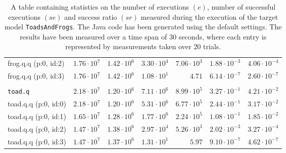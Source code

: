 \begin{table}[htbp]
{\begin{tabular}{lrrrrrr}
\hspace{3mm}frog.q.q (p:0, id:2)              &  $1.76 \cdot 10^{7}$ &  $1.42 \cdot 10^{6}$ &  $3.30 \cdot 10^{4}$ &  $7.06 \cdot 10^{3}$ & $1.88 \cdot 10^{-3}$ & $4.06 \cdot 10^{-4}$ \\
\hspace{3mm}frog.q.q (p:0, id:3)              &  $1.76 \cdot 10^{7}$ &  $1.42 \cdot 10^{6}$ &  $1.08 \cdot 10^{1}$ &               $4.71$ & $6.14 \cdot 10^{-7}$ & $2.60 \cdot 10^{-7}$ \\
\\[-8pt]\texttt{toad.q}                       &  $2.18 \cdot 10^{7}$ &  $1.20 \cdot 10^{6}$ &  $7.11 \cdot 10^{6}$ &  $8.99 \cdot 10^{5}$ & $3.27 \cdot 10^{-1}$ & $4.21 \cdot 10^{-2}$ \\
\hspace{3mm}toad.q.q (p:0, id:0)              &  $2.18 \cdot 10^{7}$ &  $1.20 \cdot 10^{6}$ &  $5.31 \cdot 10^{6}$ &  $6.77 \cdot 10^{5}$ & $2.44 \cdot 10^{-1}$ & $3.17 \cdot 10^{-2}$ \\
\hspace{3mm}toad.q.q (p:0, id:1)              &  $1.65 \cdot 10^{7}$ &  $1.28 \cdot 10^{6}$ &  $1.77 \cdot 10^{6}$ &  $2.24 \cdot 10^{5}$ & $1.08 \cdot 10^{-1}$ & $1.85 \cdot 10^{-2}$ \\
\hspace{3mm}toad.q.q (p:0, id:2)              &  $1.47 \cdot 10^{7}$ &  $1.38 \cdot 10^{6}$ &  $2.97 \cdot 10^{4}$ &  $5.26 \cdot 10^{3}$ & $2.02 \cdot 10^{-3}$ & $3.27 \cdot 10^{-4}$ \\
\hspace{3mm}toad.q.q (p:0, id:3)              &  $1.47 \cdot 10^{7}$ &  $1.37 \cdot 10^{6}$ &  $1.31 \cdot 10^{1}$ &               $5.97$ & $9.10 \cdot 10^{-7}$ & $4.62 \cdot 10^{-7}$ \\
\bottomrule
\end{tabular}
}
\caption{A table containing statistics on the number of executions $(e)$, number of successful executions $(se)$ and success ratio $(sr)$ measured during the execution of the target model \texttt{ToadsAndFrogs}. The Java code has been generated using the default settings. The results have been measured over a time span of 30 seconds, where each entry is represented by measurements taken over 20 trials.}
\label{table:frequency_results_toadsandfrogs_default}
\end{table}